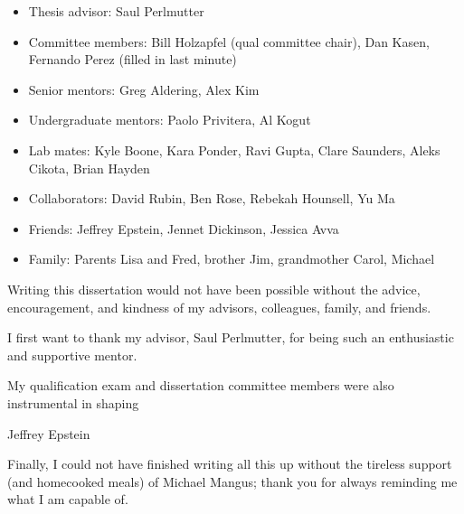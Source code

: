 \begin{itemize}
    \item Thesis advisor: Saul Perlmutter
    \item Committee members: Bill Holzapfel (qual committee chair), Dan Kasen, Fernando Perez (filled in last minute)
    \item Senior mentors: Greg Aldering, Alex Kim
    \item Undergraduate mentors: Paolo Privitera, Al Kogut
    \item Lab mates: Kyle Boone, Kara Ponder, Ravi Gupta, Clare Saunders, Aleks Cikota, Brian Hayden
    \item Collaborators: David Rubin, Ben Rose, Rebekah Hounsell, Yu Ma
    \item Friends: Jeffrey Epstein, Jennet Dickinson, Jessica Avva
    \item Family: Parents Lisa and Fred, brother Jim, grandmother Carol, Michael
\end{itemize}

Writing this dissertation would not have been possible without the advice, encouragement, and kindness of my advisors, colleagues, family, and friends.

I first want to thank my advisor, Saul Perlmutter, for being such an enthusiastic and supportive mentor. 

My qualification exam and dissertation committee members were also instrumental in shaping 

Jeffrey Epstein

Finally, I could not have finished writing all this up without the tireless support (and homecooked meals) of Michael Mangus; thank you for always reminding me what I am capable of.